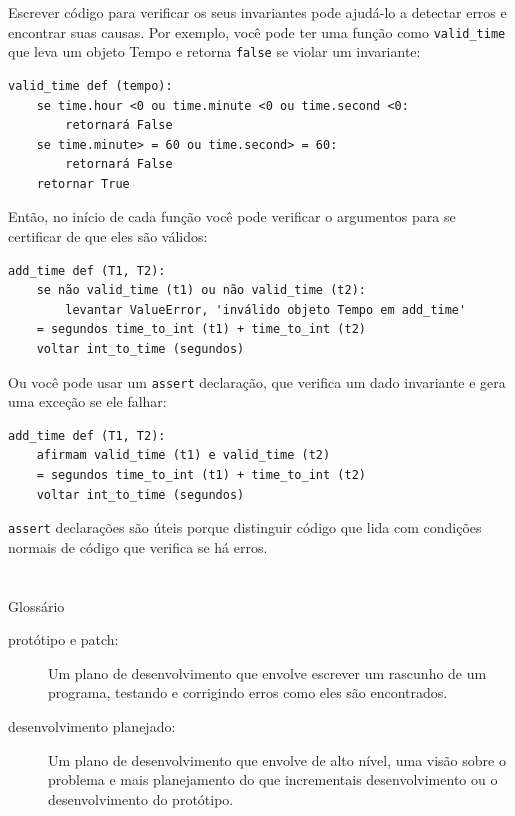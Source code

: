 \documentclass[10pt]{book}
\begin{document}
\begin{exercise}
\begin{v erbatim}
{Escrever código para verificar os seus invariantes pode ajudá-lo a detectar erros
e encontrar suas causas. Por exemplo, você pode ter uma função
como \verb "valid_time" que leva um objeto Tempo e retorna
{\tt false} se violar um invariante:

\begin{verbatim}
valid_time def (tempo):
    se time.hour <0 ou time.minute <0 ou time.second <0:
        retornará False
    se time.minute> = 60 ou time.second> = 60:
        retornará False
    retornar True
\end{verbatim}
%
Então, no início de cada função você pode verificar o
argumentos para se certificar de que eles são válidos:

\begin{verbatim}
add_time def (T1, T2):
    se não valid_time (t1) ou não valid_time (t2):
        levantar ValueError, 'inválido objeto Tempo em add_time'
    = segundos time_to_int (t1) + time_to_int (t2)
    voltar int_to_time (segundos)
\end{verbatim}
%
Ou você pode usar um {\tt assert} declaração, que verifica um dado invariante
e gera uma exceção se ele falhar:

\begin{verbatim}
add_time def (T1, T2):
    afirmam valid_time (t1) e valid_time (t2)
    = segundos time_to_int (t1) + time_to_int (t2)
    voltar int_to_time (segundos)
\end{verbatim}
%
{\tt assert} declarações são úteis porque distinguir
código que lida com condições normais de código
que verifica se há erros.


\section{} Glossário

\begin{description}

\item[protótipo e patch:] Um plano de desenvolvimento que envolve
escrever um rascunho de um programa, testando e corrigindo erros como
eles são encontrados.

\item[desenvolvimento planejado:] Um plano de desenvolvimento que envolve
de alto nível, uma visão sobre o problema e mais planejamento do que incrementais
desenvolvimento ou o desenvolvimento do protótipo.


\end{description}}
\end{v erbatim}
\end{exercise}
\end{document}
